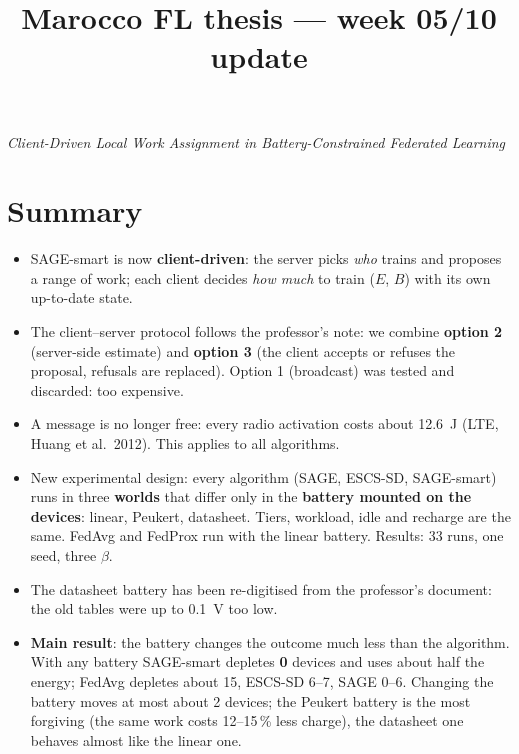 \documentclass[11pt,a4paper]{article}
\title{\bfseries Marocco FL thesis --- week 05/10 update}
\author{}
\date{}
\begin{document}
\maketitle
\vspace{-3.2em}
\begin{center}
\emph{Client-Driven Local Work Assignment in Battery-Constrained Federated Learning}
\end{center}
\vspace{1em}

\section*{Summary}

\begin{itemize}
  \item SAGE-smart is now \textbf{client-driven}: the server picks \emph{who}
        trains and proposes a range of work; each client decides \emph{how much}
        to train ($E$, $B$) with its own up-to-date state.
  \item The client--server protocol follows the professor's note: we combine
        \textbf{option 2} (server-side estimate) and \textbf{option 3} (the
        client accepts or refuses the proposal, refusals are replaced).
        Option 1 (broadcast) was tested and discarded: too expensive.
  \item A message is no longer free: every radio activation costs about
        \SI{12.6}{\joule} (LTE, Huang et al.\ 2012). This applies to all
        algorithms.
  \item New experimental design: every algorithm (SAGE, ESCS-SD, SAGE-smart)
        runs in three \textbf{worlds} that differ only in the \textbf{battery
        mounted on the devices}: linear, Peukert, datasheet. Tiers, workload,
        idle and recharge are the same. FedAvg and FedProx run with the linear
        battery. Results: 33 runs, one seed, three $\beta$.
  \item The datasheet battery has been re-digitised from the professor's
        document: the old tables were up to \SI{0.1}{\volt} too low.
  \item \textbf{Main result}: the battery changes the outcome much less than
        the algorithm. With any battery SAGE-smart depletes \textbf{0} devices
        and uses about half the energy; FedAvg depletes about 15, ESCS-SD 6--7,
        SAGE 0--6. Changing the battery moves at most about 2 devices; the
        Peukert battery is the most forgiving (the same work costs 12--15\,\%
        less charge), the datasheet one behaves almost like the linear one.
\end{itemize}
\end{document}
